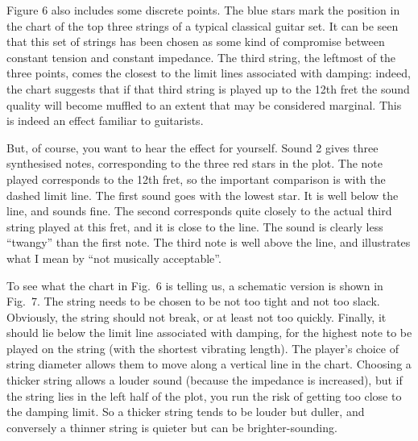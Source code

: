 
  Figure 6 also includes some discrete points. The blue stars mark the position 
  in the chart of the top three strings of a typical classical guitar set. It 
  can be seen that this set of strings has been chosen as some kind of 
  compromise between constant tension and constant impedance. The third string, 
  the leftmost of the three points, comes the closest to the limit lines 
  associated with damping: indeed, the chart suggests that if that third string 
  is played up to the 12th fret the sound quality will become muffled to an 
  extent that may be considered marginal. This is indeed an effect familiar to 
  guitarists. 

  But, of course, you want to hear the effect for yourself. Sound 2 gives three 
  synthesised notes, corresponding to the three red stars in the plot. The note 
  played corresponds to the 12th fret, so the important comparison is with the 
  dashed limit line. The first sound goes with the lowest star. It is well 
  below the line, and sounds fine. The second corresponds quite closely to the 
  actual third string played at this fret, and it is close to the line. The 
  sound is clearly less ``twangy'' than the first note. The third note is well 
  above the line, and illustrates what I mean by ``not musically acceptable''. 


  To see what the chart in Fig.\ 6 is telling us, a schematic version is shown 
  in Fig.\ 7. The string needs to be chosen to be not too tight and not too 
  slack. Obviously, the string should not break, or at least not too quickly. 
  Finally, it should lie below the limit line associated with damping, for the 
  highest note to be played on the string (with the shortest vibrating length). 
  The player's choice of string diameter allows them to move along a vertical 
  line in the chart. Choosing a thicker string allows a louder sound (because 
  the impedance is increased), but if the string lies in the left half of the 
  plot, you run the risk of getting too close to the damping limit. So a 
  thicker string tends to be louder but duller, and conversely a thinner string 
  is quieter but can be brighter-sounding. 

